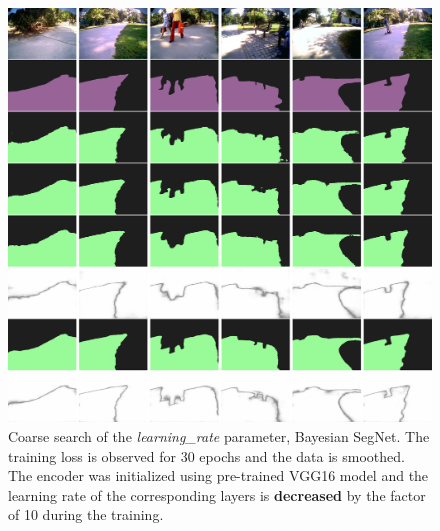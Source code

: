 \begin{figure}[htb]
	\begin{center}
		\includegraphics*[width=16cm, keepaspectratio]{obr/result.png}
	\end{center}
	\vspace{5mm}
	\caption{Coarse search of the \textit{learning\_rate} parameter, Bayesian SegNet. The training loss is observed for 30 epochs and the data is smoothed. The encoder was initialized using pre-trained VGG16 model and the learning rate of the corresponding layers is \textbf{decreased} by the factor of 10 during the training.} 
	\label{}
\end{figure}
